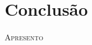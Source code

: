 \chapter{Conclusão}

%
%

\lettrine[lines=2, lhang=0.33, loversize=0.25, findent=1.5em]{A}{presento} 
\lipsum[75]

\lipsum[76]

\lipsum[77]

